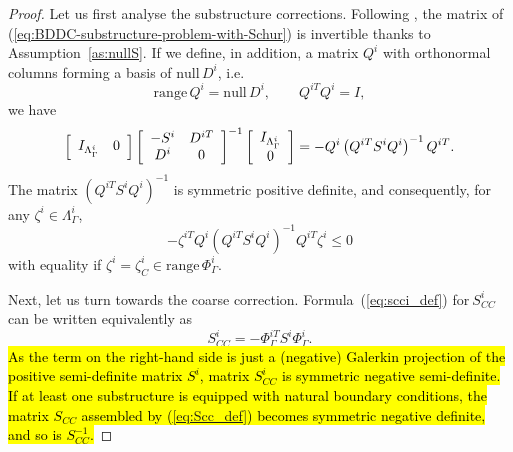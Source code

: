 \begin{proof}
Let us first analyse the substructure corrections. 
Following \cite[Section~3.3]{Benzi-2005-NSS}, the matrix of 
(\ref{eq:BDDC-substructure-problem-with-Schur})
is invertible thanks to Assumption~\ref{as:nullS}.
If we define, in addition, a matrix $Q^{i}$ with orthonormal columns forming a basis of $\mathrm{null}\,D^{i}$, i.e. 
\begin{equation}
\mathrm{range}\,Q^{i} = \mathrm{null}\,D^{i}, \qquad Q^{iT}Q^{i} = I,
\end{equation}
we have
\begin{equation}
\left[
\begin{array}
[c]{cc}%
I_{{\Lambda}_{\Gamma}^{i}} & 0 
\end{array}
\right]  
\left[
\begin{array}
[c]{cc}%
-S^{i} & D^{iT}\\
D^{i} & 0
\end{array}
\right]^{-1} 
\left[
\begin{array}
[c]{c}%
I_{{\Lambda}_{\Gamma}^{i}} \\ 
0 
\end{array}
\right]  
= 
-Q^{i}\left(Q^{iT} S^{i} Q^{i}\right)^{-1}Q^{iT}.
\end{equation}
The matrix $\left(Q^{iT} S^{i} Q^{i}\right)^{-1}$ is symmetric positive definite,
and consequently, for any $\zeta^{i} \in {\Lambda}_{\Gamma}^{i}$,
\begin{equation}
-\zeta^{iT}Q^{i}\left(Q^{iT} S^{i} Q^{i}\right)^{-1}Q^{iT}\zeta^{i} \le 0
\end{equation}
with equality if $\zeta^{i} = \zeta^{i}_{C} \in \mathrm{range}\,\Phi_{\Gamma}^{i}$.

Next, let us turn towards the coarse correction.
Formula~(\ref{eq:scci_def}) for$~S_{CC}^{i}$ can be written equivalently as
\begin{equation}
S_{CC}^{i}=-\Phi_{\Gamma}^{iT}S^{i}\Phi_{\Gamma}^{i}.
\end{equation}
\hl{As the term on the right-hand side is just a (negative) Galerkin projection of 
the positive semi-definite matrix $S^{i}$, matrix $S_{CC}^{i}$ is symmetric negative semi-definite.
If at least one substructure is equipped with \hl{natural} boundary conditions, the matrix $S_{CC}$ assembled by
(\ref{eq:Scc_def}) becomes symmetric negative definite, and so is $S_{CC}^{-1}$.}


\end{proof}
